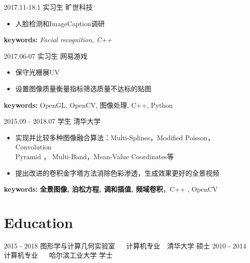 \documentclass[]{cv-style} %
\begin{document}
\begin{entrylist}
  \entry
    {2017.11-18.1}
    {实习生}
    {旷世科技}
    {
      \vspace{-5pt}
      \leftmargini=-1cm
      \begin{itemize}
        \setlength{\itemsep}{3pt}
        \item {人脸检测和ImageCaption调研}
      \end{itemize}
      \vspace{5pt}
      \hspace{-1.2cm} \textbf{keywords:} \emph{Facial recognition, C++}
    }
  
  \entry
    {2017.06-07}
    {实习生}
    {网易游戏}
    {
      \vspace{-5pt}
      \leftmargini=-1cm
      \begin{itemize}
        \setlength{\itemsep}{3pt}
        \item {保守光栅展UV}
        \item {设置图像质量衡量指标筛选质量不达标的贴图}
      \end{itemize}
      \vspace{5pt}
      \hspace{-1.2cm} \textbf{keywords:} OpenGL, OpenCV, 图像处理, C++, Python
    }
  
  \entry
    {2015.09 - 2018.07}
    {学生}
    {清华大学}
    {
      \vspace{-5pt}
      \leftmargini=-1cm
      \begin{itemize}
        \setlength{\itemsep}{3pt}
        \item {实现并比较多种图像融合算法：Multi-Splines，Modified Poisson，Convolution\\ Pyramid
        ， Multi-Band，Mean-Value Coordinates等}
        \item {提出改进的卷积金字塔方法消除色彩渗透，生成效果更好的全景视频}
      \end{itemize}
      \vspace{5pt}
      \hspace{-1.2cm} \textbf{keywords:} \textbf{全景图像, 泊松方程, 调和插值, 频域卷积}，{C++ , OpenCV}
  }
  
  \end{entrylist}



\section{Education}
\begin{entrylist}
\vspace{-10pt}
\entry
{2015 - 2018}
{图形学与计算几何实验室 {\normalfont ~~ 计算机专业~~清华大学}}
{ 硕士}
{}
\vspace{-10pt}
\entry
{2010 - 2014}
{计算机专业 {\normalfont ~~ 哈尔滨工业大学}}
{ 学士}
{ }
\end{entrylist}
\vspace{-5pt} 
\end{document}
